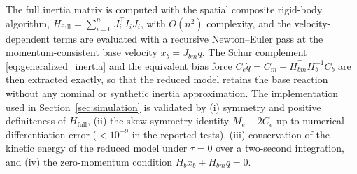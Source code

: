 \begin{remark}
The full inertia matrix is computed with the spatial composite rigid-body algorithm,
$H_{\mathrm{full}}=\sum_{i=0}^nJ_i^\top I_iJ_i$, with $O(n^2)$ complexity, and the
velocity-dependent terms are evaluated with a recursive Newton--Euler pass at the
momentum-consistent base velocity $\dot x_b=J_{bm}\dot q$. The Schur complement
\eqref{eq:generalized_inertia} and the equivalent bias force
$C_e\dot q=C_m-H_{bm}^\top H_b^{-1}C_b$ are then extracted exactly, so that the
reduced model retains the base reaction without any nominal or synthetic inertia
approximation. The implementation used in Section~\ref{sec:simulation} is
validated by (i) symmetry and positive definiteness of $H_{\mathrm{full}}$,
(ii) the skew-symmetry identity $\dot M_e-2C_e$ up to numerical differentiation
error ($<10^{-9}$ in the reported tests), (iii) conservation of the kinetic
energy of the reduced model under $\tau=0$ over a two-second integration, and
(iv) the zero-momentum condition $H_b\dot x_b+H_{bm}\dot q=0$.
\end{remark}

